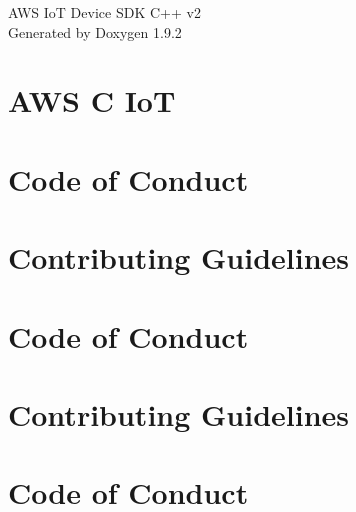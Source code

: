 \documentclass[twoside]{book}
\newcommand{\+}{\discretionary{\mbox{\scriptsize$\hookleftarrow$}}{}{}}
\newcommand{\clearemptydoublepage}{%
    \newpage{\pagestyle{empty}\cleardoublepage}%
  }
\begin{document}
  \raggedbottom
    \hypersetup{pageanchor=false,
                bookmarksnumbered=true,
                pdfencoding=unicode
               }
  \begin{titlepage}
  \vspace*{7cm}
  \begin{center}%
  {\Large AWS Io\+T Device SDK C++ v2}\\
  \vspace*{1cm}
  {\large Generated by Doxygen 1.9.2}\\
  \end{center}
  \end{titlepage}
  \clearemptydoublepage
  \tableofcontents
  \clearemptydoublepage
  \hypersetup{pageanchor=true}
\chapter{AWS C IoT}
\label{index}\hypertarget{index}{}
\chapter{Code of Conduct}
\label{md__c_o_d_e__o_f__c_o_n_d_u_c_t}

\chapter{Contributing Guidelines}
\label{md__c_o_n_t_r_i_b_u_t_i_n_g}

\chapter{Code of Conduct}
\label{md_crt_aws_c_iot__c_o_d_e__o_f__c_o_n_d_u_c_t}

\chapter{Contributing Guidelines}
\label{md_crt_aws_c_iot__c_o_n_t_r_i_b_u_t_i_n_g}

\chapter{Code of Conduct}
\label{md_crt_aws_crt_cpp__c_o_d_e__o_f__c_o_n_d_u_c_t}

\end{document}
